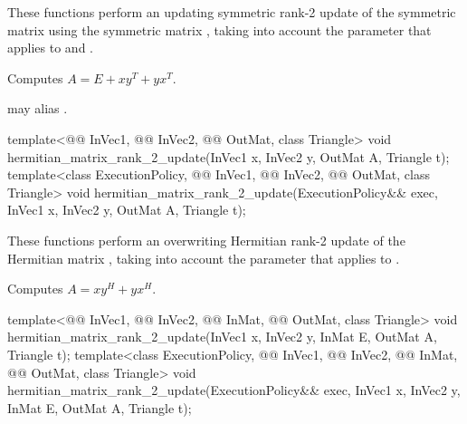 \begin{itemdescr}
\pnum
These functions perform
an updating symmetric rank-2 update of the symmetric matrix 
using the symmetric matrix ,
taking into account the  parameter
that applies to  and .

\pnum
\effects
Computes $A = E + x y^T + y x^T$.

\pnum
\remarks
{} may alias .
\end{itemdescr}

%
\begin{itemdecl}
template<@@ InVec1, @@ InVec2,
         @@ OutMat, class Triangle>
  void hermitian_matrix_rank_2_update(InVec1 x, InVec2 y, OutMat A, Triangle t);
template<class ExecutionPolicy, @@ InVec1, @@ InVec2,
         @@ OutMat, class Triangle>
  void hermitian_matrix_rank_2_update(ExecutionPolicy&& exec,
                                      InVec1 x, InVec2 y, OutMat A, Triangle t);
\end{itemdecl}

\begin{itemdescr}
\pnum
These functions perform
an overwriting Hermitian rank-2 update of the Hermitian matrix ,
taking into account the  parameter
that applies to .

\pnum
\effects
Computes $A = x y^H + y x^H$.
\end{itemdescr}

%
\begin{itemdecl}
template<@@ InVec1, @@ InVec2, @@ InMat,
         @@ OutMat, class Triangle>
  void hermitian_matrix_rank_2_update(InVec1 x, InVec2 y, InMat E, OutMat A, Triangle t);
template<class ExecutionPolicy, @@ InVec1, @@ InVec2, @@ InMat,
         @@ OutMat, class Triangle>
  void hermitian_matrix_rank_2_update(ExecutionPolicy&& exec,
                                      InVec1 x, InVec2 y, InMat E, OutMat A, Triangle t);
\end{itemdecl}


